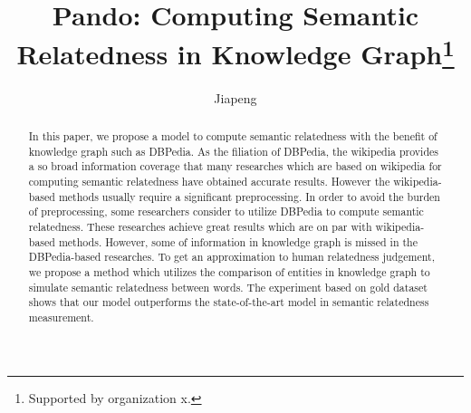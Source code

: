 \documentclass[runningheads]{llncs}
\begin{document}
  \title{Pando: Computing Semantic Relatedness in Knowledge Graph\thanks{Supported by organization x.}}
  \author{Jiapeng }
  
  \maketitle              %
  \begin{abstract}
    In this paper, we propose a model to compute semantic relatedness with the benefit of knowledge graph
    such as DBPedia.
    As the filiation of DBPedia, the wikipedia provides a so broad information coverage that many researches which
    are based on wikipedia for computing semantic relatedness have obtained accurate results. However the wikipedia-based
    methods usually require a significant preprocessing. In order to avoid the burden of preprocessing, some researchers
    consider to utilize DBPedia to compute semantic relatedness. These researches
    achieve great results which are on par with wikipedia-based methods. However, some of information in knowledge graph
    is missed in the DBPedia-based researches. To get an approximation to human relatedness judgement, we propose a method which
    utilizes the comparison of entities in knowledge graph to simulate semantic relatedness between words.
    The experiment based on gold dataset shows that our model outperforms the state-of-the-art model in semantic relatedness measurement.
  
  \end{abstract}
  
  
  
  
  

  
  
  
\end{document}

